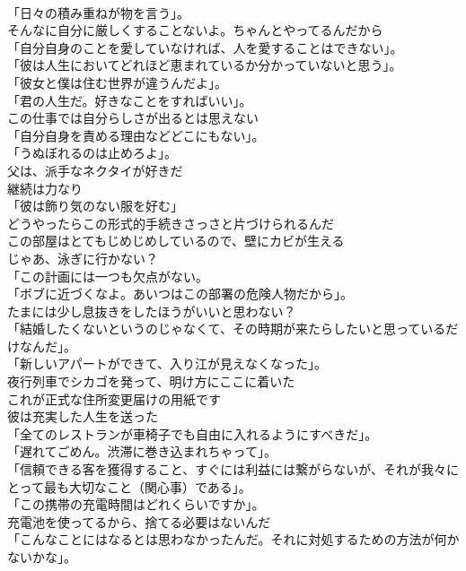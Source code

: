 \documentclass[8pt]{extreport}
\begin{document}
\begin{CJK}{UTF8}{min}
\\	「日々の積み重ねが物を言う」。	
\\	そんなに自分に厳しくすることないよ。ちゃんとやってるんだから	
\\	「自分自身のことを愛していなければ、人を愛することはできない」。	
\\	「彼は人生においてどれほど恵まれているか分かっていないと思う」。	
\\	「彼女と僕は住む世界が違うんだよ」。	
\\	「君の人生だ。好きなことをすればいい」。	
\\	この仕事では自分らしさが出るとは思えない	
\\	「自分自身を責める理由などどこにもない」。	
\\	「うぬぼれるのは止めろよ」。	
\\	父は、派手なネクタイが好きだ	
\\	継続は力なり	
\\	「彼は飾り気のない服を好む」	
\\	どうやったらこの形式的手続きさっさと片づけられるんだ	
\\	この部屋はとてもじめじめしているので、壁にカビが生える	
\\	じゃあ、泳ぎに行かない？	
\\	「この計画には一つも欠点がない。	
\\	「ボブに近づくなよ。あいつはこの部署の危険人物だから」。	
\\	たまには少し息抜きをしたほうがいいと思わない？	
\\	「結婚したくないというのじゃなくて、その時期が来たらしたいと思っているだけなんだ」。	
\\	「新しいアパートができて、入り江が見えなくなった」。	
\\	夜行列車でシカゴを発って、明け方にここに着いた	
\\	これが正式な住所変更届けの用紙です	
\\	彼は充実した人生を送った	
\\	「全てのレストランが車椅子でも自由に入れるようにすべきだ」。	
\\	「遅れてごめん。渋滞に巻き込まれちゃって」。	
\\	「信頼できる客を獲得すること、すぐには利益には繋がらないが、それが我々にとって最も大切なこと（関心事）である」。	
\\	「この携帯の充電時間はどれくらいですか」。	
\\	充電池を使ってるから、捨てる必要はないんだ	
\\	「こんなことにはなるとは思わなかったんだ。それに対処するための方法が何かないかな」。	

\end{CJK}
\end{document}

